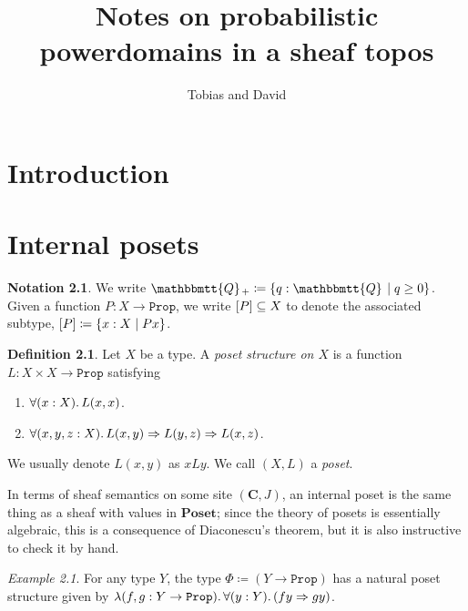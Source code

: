 \documentclass[11pt, oneside, article]{memoir}
\theoremstyle{plain}
\theoremstyle{definition}
\newtheorem{definition}[theorem]{Definition}
\newtheorem{notation}[theorem]{Notation}
\theoremstyle{remark}
\newtheorem{example}[theorem]{Example}
\renewcommand{\ss}{\subseteq}
\DeclarePairedDelimiter{\subtype}{[}{]}
\newcommand{\const}[1]{\mathtt{#1}}
\newcommand{\Cat}[1]{\mathbf{#1}}
\newcommand{\internal}[1]{\raisebox{-.03ex}{$\mathbbmtt{#1}$}}
\newcommand{\hs}{\hspace{1.1pt}}
\newcommand{\tQQ}{\internal{Q}\hs}
\newcommand{\tQQp}{\tQQ_{+}}
\newcommand{\Prop}{\const{Prop}}
\newcommand{\Poset}{\Cat{Poset}}
\renewcommand{\C}{\Cat{C}}
\newcommand{\imp}{\Rightarrow}
\begin{document}
\title{Notes on probabilistic powerdomains in a sheaf topos}

\author{Tobias and David}

\maketitle

\tableofcontents*



\chapter{Introduction}


\chapter{Internal posets}

\begin{notation}
We write $\tQQp\coloneqq\{q:\tQQ\mid q\geq0\}$. Given a function $P:X\to\Prop$, we write $\subtype{P}\ss X$ to denote the associated subtype, $\subtype{P}\coloneqq\{x:X\mid Px\}$.
\end{notation}

\begin{definition}
Let $X$ be a type. A \emph{poset structure on $X$} is a function $L:X\times X\to\Prop$ satisfying
\begin{enumerate}
	\item $\forall(x:X)\ldotp L(x,x)$.
	\item $\forall(x,y,z:X)\ldotp L(x,y)\imp L(y,z)\imp L(x,z)$.
\end{enumerate}
We usually denote $L(x,y)$ as $x L y$. We call $(X,L)$ a \emph{poset}.
\end{definition}

In terms of sheaf semantics on some site $(\C,J)$, an internal poset is the same thing as a sheaf with values in $\Poset$; since the theory of posets is essentially algebraic, this is a consequence of Diaconescu's theorem, but it is also instructive to check it by hand.

\begin{example}
For any type $Y$, the type $\Phi\coloneqq (Y\to\Prop)$ has a natural poset structure given by $\lambda(f,g:Y\to\Prop)\ldotp\forall(y:Y)\ldotp (fy\imp gy)$.
\end{example}
\end{document}
